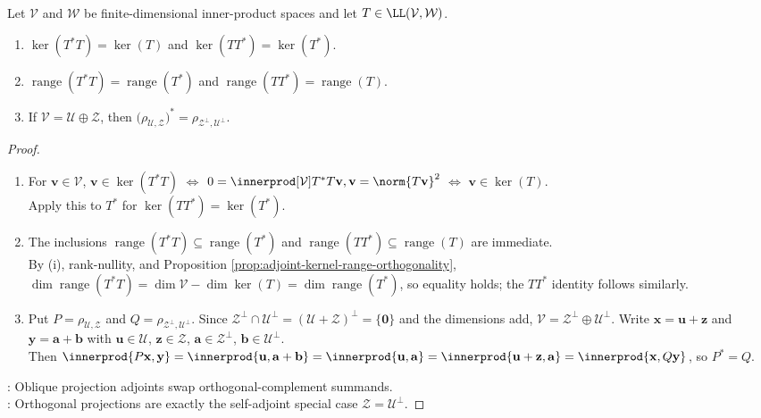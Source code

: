 \begin{proposition} \label{prop:adjoint-product-kernels-ranges-and-projections} \\
Let $\mathcal{V}$ and $\mathcal{W}$ be finite-dimensional inner-product spaces and let $T\in\LL(\mathcal{V},\mathcal{W})$.
\begin{enumerate}[label=(\roman*)]
\setlength{\itemsep}{0pt}
\item $\ker(T^*T)=\ker(T)$ and $\ker(TT^*)=\ker(T^*)$.
\item $\operatorname{range}(T^*T)=\operatorname{range}(T^*)$ and $\operatorname{range}(TT^*)=\operatorname{range}(T)$.
\item If $\mathcal{V}=\mathcal{U}\oplus\mathcal{Z}$, then $\bigl(\rho_{\mathcal{U},\mathcal{Z}}\bigr)^*=\rho_{\mathcal{Z}^{\perp},\mathcal{U}^{\perp}}$.
\end{enumerate}
\begin{proof}
\begin{enumerate}[label=(\roman*)]
\setlength{\itemsep}{0pt}
\item For $\mathbf{v}\in\mathcal{V}$, $\mathbf{v}\in\ker(T^*T)$ $\Longleftrightarrow$ $0=\innerprod[\mathcal{V}]{T^*T\mathbf{v},\mathbf{v}} =\norm{T\mathbf{v}}^2$ $\Longleftrightarrow$ $\mathbf{v}\in\ker(T)$.\\
Apply this to $T^*$ for $\ker(TT^*)=\ker(T^*)$.
\item The inclusions $\operatorname{range}(T^*T)\subseteq\operatorname{range}(T^*)$ and $\operatorname{range}(TT^*)\subseteq\operatorname{range}(T)$ are immediate.\\
By (i), rank-nullity, and Proposition \ref{prop:adjoint-kernel-range-orthogonality}, $\dim\operatorname{range}(T^*T)=\dim\mathcal{V}-\dim\ker(T) =\dim\operatorname{range}(T^*)$, so equality holds; the $TT^*$ identity follows similarly.
\item Put $P=\rho_{\mathcal{U},\mathcal{Z}}$ and $Q=\rho_{\mathcal{Z}^{\perp},\mathcal{U}^{\perp}}$. Since $\mathcal{Z}^{\perp}\cap\mathcal{U}^{\perp}=(\mathcal{U}+\mathcal{Z})^{\perp}=\{\mathbf{0}\}$ and the dimensions add, $\mathcal{V}=\mathcal{Z}^{\perp}\oplus\mathcal{U}^{\perp}$. Write $\mathbf{x}=\mathbf{u}+\mathbf{z}$ and $\mathbf{y}=\mathbf{a}+\mathbf{b}$ with $\mathbf{u}\in\mathcal{U}$, $\mathbf{z}\in\mathcal{Z}$, $\mathbf{a}\in\mathcal{Z}^{\perp}$, $\mathbf{b}\in\mathcal{U}^{\perp}$.\\
Then $\innerprod{P\mathbf{x},\mathbf{y}} =\innerprod{\mathbf{u},\mathbf{a}+\mathbf{b}} =\innerprod{\mathbf{u},\mathbf{a}} =\innerprod{\mathbf{u}+\mathbf{z},\mathbf{a}} =\innerprod{\mathbf{x},Q\mathbf{y}}$, so $P^*=Q$.
\end{enumerate}
: Oblique projection adjoints swap orthogonal-complement summands.\\
: Orthogonal projections are exactly the self-adjoint special case $\mathcal{Z}=\mathcal{U}^{\perp}$.
\end{proof}
\end{proposition}

